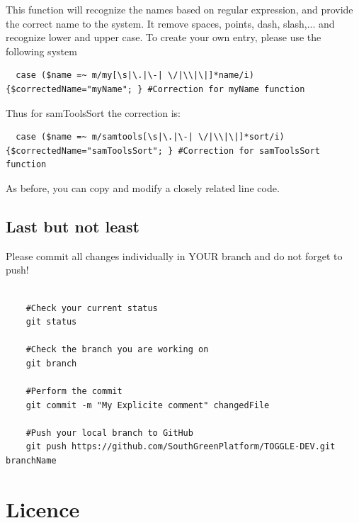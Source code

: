 \documentclass[a4paper,10pt]{report}
\begin{document}
This function will recognize the names based on regular expression, and provide the correct name to the system. It remove spaces, points, dash, slash,... and recognize lower and upper case.
To create your own entry, please use the following system

\begin{lstlisting}
  case ($name =~ m/my[\s|\.|\-| \/|\\|\|]*name/i){$correctedName="myName"; } #Correction for myName function
\end{lstlisting}

Thus for samToolsSort the correction is:
\begin{lstlisting}
  case ($name =~ m/samtools[\s|\.|\-| \/|\\|\|]*sort/i){$correctedName="samToolsSort"; } #Correction for samToolsSort function
\end{lstlisting}

As before, you can copy and modify a closely related line code.

\section{Last but not least}

Please commit all changes individually in YOUR branch and do not forget to push!

\begin{verbatim}
 
    #Check your current status
    git status

    #Check the branch you are working on
    git branch

    #Perform the commit
    git commit -m "My Explicite comment" changedFile

    #Push your local branch to GitHub
    git push https://github.com/SouthGreenPlatform/TOGGLE-DEV.git branchName

\end{verbatim}


\appendix

\chapter{Licence}
\end{document}
